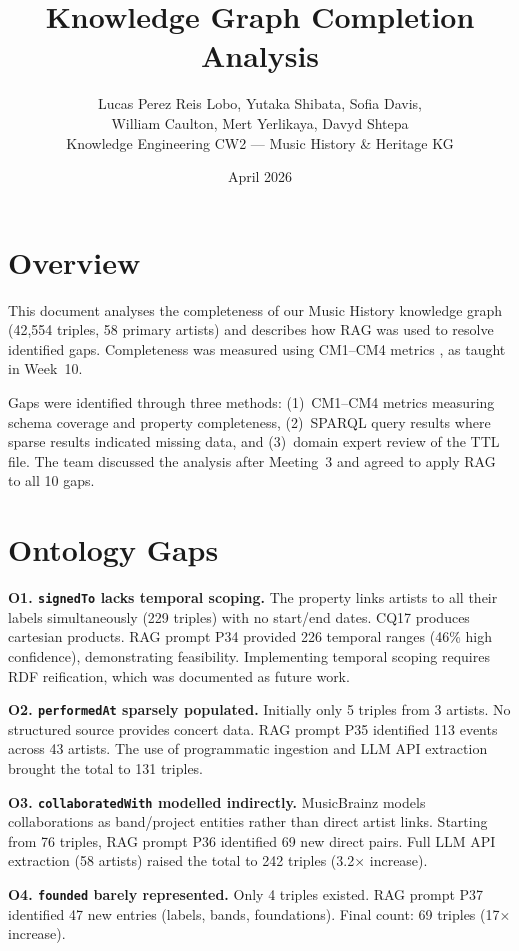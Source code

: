 \documentclass[11pt,a4paper]{article}
\title{Knowledge Graph Completion Analysis}
\author{Lucas Perez Reis Lobo, Yutaka Shibata, Sofia Davis, \\ William Caulton, Mert Yerlikaya, Davyd Shtepa \\ \small Knowledge Engineering CW2 --- Music History \& Heritage KG}
\date{April 2026}
\begin{document}
\maketitle

\section{Overview}

This document analyses the completeness of our Music History knowledge graph (42,554 triples, 58 primary artists) and describes how RAG was used to resolve identified gaps. Completeness was measured using CM1--CM4 metrics \cite{zaveri2015}, as taught in Week~10.

Gaps were identified through three methods: (1)~CM1--CM4 metrics measuring schema coverage and property completeness, (2)~SPARQL query results where sparse results indicated missing data, and (3)~domain expert review of the TTL file. The team discussed the analysis after Meeting~3 and agreed to apply RAG to all 10 gaps.

\section{Ontology Gaps}

\textbf{O1. \texttt{signedTo} lacks temporal scoping.} The property links artists to all their labels simultaneously (229 triples) with no start/end dates. CQ17 produces cartesian products. RAG prompt P34 provided 226 temporal ranges (46\% high confidence), demonstrating feasibility. Implementing temporal scoping requires RDF reification, which was documented as future work.

\textbf{O2. \texttt{performedAt} sparsely populated.} Initially only 5 triples from 3 artists. No structured source provides concert data. RAG prompt P35 identified 113 events across 43 artists. The use of programmatic ingestion and LLM API extraction brought the total to 131 triples.

\textbf{O3. \texttt{collaboratedWith} modelled indirectly.} MusicBrainz models collaborations as band/project entities rather than direct artist links. Starting from 76 triples, RAG prompt P36 identified 69 new direct pairs. Full LLM API extraction (58 artists) raised the total to 242 triples (3.2$\times$ increase).

\textbf{O4. \texttt{founded} barely represented.} Only 4 triples existed. RAG prompt P37 identified 47 new entries (labels, bands, foundations). Final count: 69 triples (17$\times$ increase).
\end{document}

